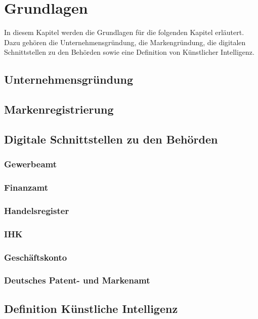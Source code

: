 \newpage

\section{Grundlagen} \label{grundlagen}
In diesem Kapitel werden die Grundlagen für die folgenden Kapitel erläutert. Dazu gehören die Unternehmensgründung, die Markengründung, die digitalen Schnittstellen zu den Behörden sowie eine Definition von Künstlicher Intelligenz.


\subsection{Unternehmensgründung} \label{unternehmensgruendung}


\subsection{Markenregistrierung} \label{markenregistrierung}


\subsection{Digitale Schnittstellen zu den Behörden} \label{digitaleBehoerden}

\subsubsection{Gewerbeamt} \label{gewerbeamt}

\subsubsection{Finanzamt} \label{finanzamt}

\subsubsection{Handelsregister} \label{handelsregister}

\subsubsection{IHK} \label{ihk}

\subsubsection{Geschäftskonto} \label{geschaeftskonto}

\subsubsection{Deutsches Patent- und Markenamt} \label{patentamt}


\subsection{Definition Künstliche Intelligenz} \label{wasIstKI}

